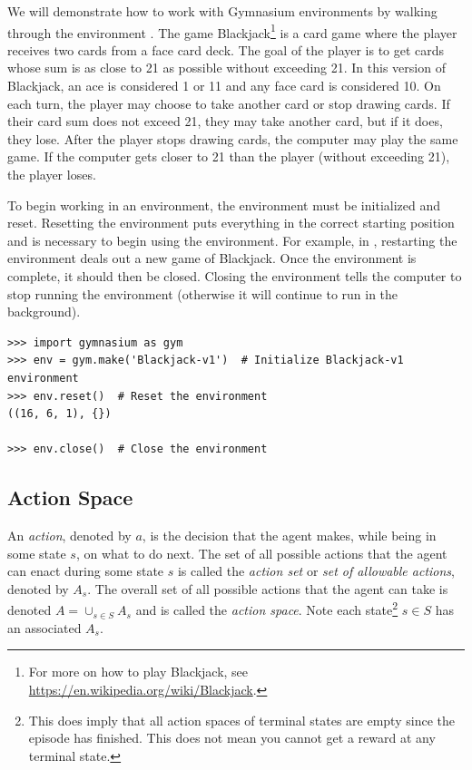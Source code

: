 We will demonstrate how to work with Gymnasium environments by walking through the environment .
The game Blackjack\footnote{For more on how to play Blackjack, see \url{https://en.wikipedia.org/wiki/Blackjack}.} is a card game where the player receives two cards from a face card deck.
The goal of the player is to get cards whose sum is as close to 21 as possible without exceeding 21.
In this version of Blackjack, an ace is considered 1 or 11 and any face card is considered 10.
On each turn, the player may choose to take another card or stop drawing cards.
If their card sum does not exceed 21, they may take another card, but if it does, they lose.
After the player stops drawing cards, the computer may play the same game.
If the computer gets closer to 21 than the player (without exceeding 21), the player loses.

To begin working in an environment, the environment must be initialized and reset.
Resetting the environment puts everything in the correct starting position and is necessary to begin using the environment.
For example, in , restarting the environment deals out a new game of Blackjack.
Once the environment is complete, it should then be closed.
Closing the environment tells the computer to stop running the environment (otherwise it will continue to run in the background).

\begin{lstlisting}
>>> import gymnasium as gym
>>> env = gym.make('Blackjack-v1')  # Initialize Blackjack-v1 environment
>>> env.reset()  # Reset the environment
((16, 6, 1), {})

>>> env.close()  # Close the environment
\end{lstlisting}

\subsection*{Action Space}
An \emph{action}, denoted by $a$, is the decision that the agent makes, while being in some state $s$, on what to do next.
The set of all possible actions that the agent can enact during some state $s$ is called the \emph{action set} or \emph{set of allowable actions}, denoted by $A_s$.
The overall set of all possible actions that the agent can take is denoted $A=\cup_{s\in S} A_s$ and is called the \emph{action space}.
Note each state\footnote{This does imply that all action spaces of terminal states are empty since the episode has finished. This does not mean you cannot get a reward at any terminal state.} $s\in S$ has an associated $A_s$.

